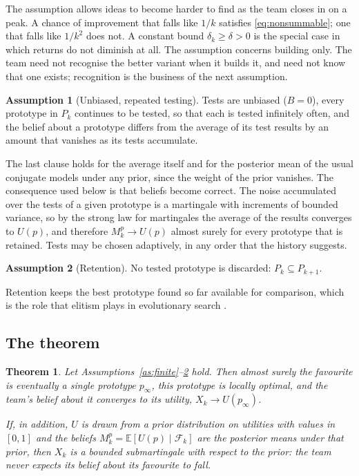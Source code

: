\documentclass[10pt,twocolumn]{article}
\newcommand{\E}{\mathbb{E}}
\newcommand{\filt}{\mathcal{F}}
\newcommand{\Pk}{P_k}
\newtheorem{theorem}{Theorem}
\theoremstyle{definition}
\newtheorem{assumption}{Assumption}
\begin{document}
The assumption allows ideas to become harder to find as the team closes in on a peak. A chance of improvement that falls like $1/k$ satisfies \eqref{eq:nonsummable}; one that falls like $1/k^2$ does not. A constant bound $\delta_k\ge\delta>0$ is the special case in which returns do not diminish at all. The assumption concerns building only. The team need not recognise the better variant when it builds it, and need not know that one exists; recognition is the business of the next assumption.

\begin{assumption}[Unbiased, repeated testing]
\label{as:test}
Tests are unbiased ($B=0$), every prototype in $\Pk$ continues to be tested, so that each is tested infinitely often, and the belief about a prototype differs from the average of its test results by an amount that vanishes as its tests accumulate.
\end{assumption}

The last clause holds for the average itself and for the posterior mean of the usual conjugate models under any prior, since the weight of the prior vanishes. The consequence used below is that beliefs become correct. The noise accumulated over the tests of a given prototype is a martingale with increments of bounded variance, so by the strong law for martingales \citep[Sec.~4.5]{durrett2019} the average of the results converges to $U(p)$, and therefore $M^p_k\to U(p)$ almost surely for every prototype that is retained. Tests may be chosen adaptively, in any order that the history suggests.

\begin{assumption}[Retention]
\label{as:retention}
No tested prototype is discarded: $\Pk\subseteq P_{k+1}$.
\end{assumption}

Retention keeps the best prototype found so far available for comparison, which is the role that elitism plays in evolutionary search \citep{rudolph1994}.

\subsection{The theorem}

\begin{theorem}
\label{thm:converge}
Let Assumptions~\ref{as:finite}--\ref{as:retention} hold. Then almost surely the favourite is eventually a single prototype $p_\infty$, this prototype is locally optimal, and the team's belief about it converges to its utility, $X_k\to U(p_\infty)$.

If, in addition, $U$ is drawn from a prior distribution on utilities with values in $[0,1]$ and the beliefs $M^p_k=\E[U(p)\mid\filt_k]$ are the posterior means under that prior, then $X_k$ is a bounded submartingale with respect to the prior: the team never expects its belief about its favourite to fall.
\end{theorem}
\end{document}

